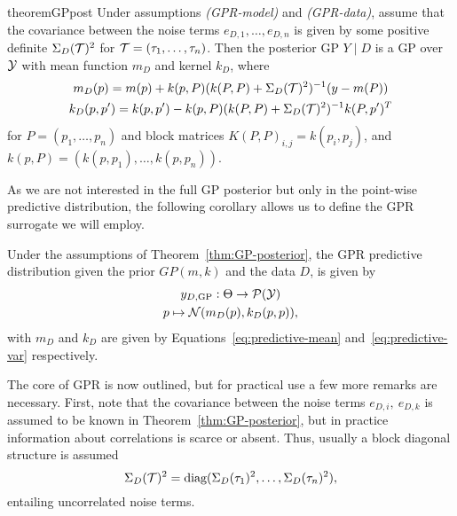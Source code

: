 \begin{restatable}[GP posterior]{theorem}{GPpost} \label{thm:GP-posterior}
    Under assumptions \textit{(GPR-model)} and \textit{(GPR-data)}, assume that the covariance between the noise terms $e_{D,1},\dots,e_{D,n}$ is given by some positive definite $\Sigma_D(\mathcal T)^2$ for $\mathcal T = (\tau_1, \ldots, \tau_n)$. \newline
    Then the posterior GP $Y \mid D$ is a GP over $\mathcal Y$ with mean function $m_D$ and kernel $k_D$, where
    \begin{gather}
        m_D(p) = m(p) + k(p, P) (k(P,P) + \Sigma_D(\mathcal T)^2 )^{-1} (y - m(P)) \label{eq:predictive-mean} \\
        k_D(p, p') = k(p, p') - k(p, P) (k(P,P) + \Sigma_D(\mathcal T)^2 )^{-1} k(P, p')^T \label{eq:predictive-var}
    \end{gather}
    for $P = (p_1, \ldots, p_n)$ and block matrices $K(P,P)_{i,j} = k(p_i, p_j)$, and $k(p, P) = (k(p, p_1), \ldots, k(p, p_n))$.
\end{restatable}

As we are not interested in the full GP posterior but only in the point-wise predictive distribution, the following corollary allows us to define the GPR surrogate we will employ.
\begin{cor}
    Under the assumptions of Theorem~\ref{thm:GP-posterior}, the GPR predictive distribution given the prior $GP(m,k)$ and the data $D$, is given by 
    \begin{gather*}
        y_{D, \text{GP}} : \Theta \rightarrow \mathcal P( \mathcal Y) \\
        p \mapsto \mathcal N( m_D(p), k_D(p,p) ),
    \end{gather*}
    with $m_D$ and $k_D$ are given by Equations~\eqref{eq:predictive-mean} and~\eqref{eq:predictive-var} respectively.
\end{cor}

The core of GPR is now outlined, but for practical use a few more remarks are necessary. \newline
First, note that the covariance between the noise terms $e_{D,i}, \ e_{D,k}$ is assumed to be known in Theorem~\ref{thm:GP-posterior}, but in practice information about correlations is scarce or absent. Thus, usually a block diagonal structure is assumed 
\begin{equation} \label{eq:GPR-noise-corr}
    \Sigma_D(\mathcal T)^2 = \text{diag}(\Sigma_D(\tau_1)^2, \ldots, \Sigma_D(\tau_n)^2),
\end{equation}
entailing uncorrelated noise terms.

